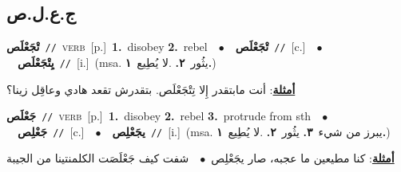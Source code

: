 \documentclass[10pt,a4paper,twoside]{article} %
\begin{document}
\begin{multicols}{2}
\vspace{-3mm}
\subsection*{\color{blue}\foreignlanguage{arabic}{ج.ع.ل.ص}\color{blue}{}} 

{\setlength\topsep{0pt}\textbf{\foreignlanguage{arabic}{تْجَعْلَص}}\ {\color{gray}\texttt{//}\color{black}}\ \textsc{verb}\ [p.]\ \textbf{1.}~disobey  \textbf{2.}~rebel\ \ $\bullet$\ \ \setlength\topsep{0pt}\textbf{\foreignlanguage{arabic}{تْجَعْلَص}}\ {\color{gray}\texttt{//}\color{black}}\ [c.]\ \ $\bullet$\ \ \setlength\topsep{0pt}\textbf{\foreignlanguage{arabic}{يِتْجَعْلَص}}\ {\color{gray}\texttt{//}\color{black}}\ [i.]\ \color{gray}(msa. \foreignlanguage{arabic}{يثُور}~\foreignlanguage{arabic}{\textbf{٢.}}  .\foreignlanguage{arabic}{لا يُطِيع}~\foreignlanguage{arabic}{\textbf{١.}})\color{black}\  \begin{flushright}\color{gray}\foreignlanguage{arabic}{\textbf{\underline{\foreignlanguage{arabic}{أمثلة}}}: أنت مابتقدر إِلا تِتْجَعْلَص. بتقدرش تقعد هادي وعاقِل زينا؟}\end{flushright}\color{black}} \vspace{2mm}

{\setlength\topsep{0pt}\textbf{\foreignlanguage{arabic}{جَعْلَص}}\ {\color{gray}\texttt{//}\color{black}}\ \textsc{verb}\ [p.]\ \textbf{1.}~disobey  \textbf{2.}~rebel  \textbf{3.}~protrude from sth\ \ $\bullet$\ \ \setlength\topsep{0pt}\textbf{\foreignlanguage{arabic}{جَعْلِص}}\ {\color{gray}\texttt{//}\color{black}}\ [c.]\ \ $\bullet$\ \ \setlength\topsep{0pt}\textbf{\foreignlanguage{arabic}{يجَعْلِص}}\ {\color{gray}\texttt{//}\color{black}}\ [i.]\ \color{gray}(msa. \foreignlanguage{arabic}{يبرز من شيء}~\foreignlanguage{arabic}{\textbf{٣.}}  \foreignlanguage{arabic}{يثُور}~\foreignlanguage{arabic}{\textbf{٢.}}  .\foreignlanguage{arabic}{لا يُطِيع}~\foreignlanguage{arabic}{\textbf{١.}})\color{black}\  \begin{flushright}\color{gray}\foreignlanguage{arabic}{\textbf{\underline{\foreignlanguage{arabic}{أمثلة}}}: كنا مطيعين ما عجبه، صار يجَعْلِص\ $\bullet$\ \  شفت كيف جَعْلَصَت الكلمنتينا من الجيبة}\end{flushright}\color{black}} \vspace{2mm}


\end{multicols}
\end{document}
